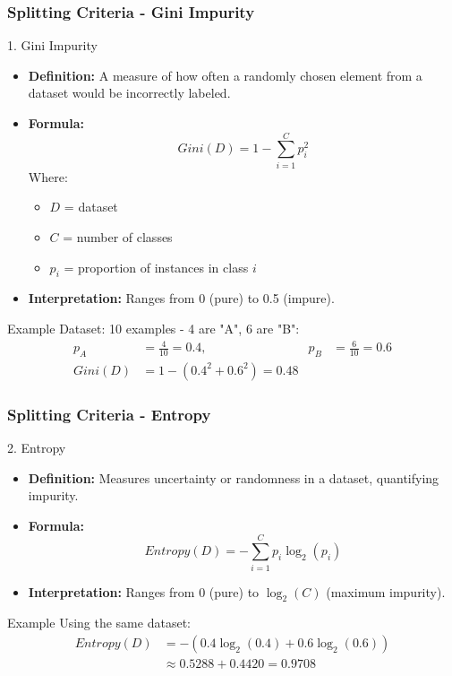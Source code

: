 \documentclass[aspectratio=169]{beamer}
\begin{document}
\begin{frame}[fragile]
  \frametitle{Splitting Criteria - Gini Impurity}
  \begin{block}{1. Gini Impurity}
    \begin{itemize}
      \item \textbf{Definition:} A measure of how often a randomly chosen element from a dataset would be incorrectly labeled.
      \item \textbf{Formula:}
        \begin{equation}
        Gini(D) = 1 - \sum_{i=1}^{C} p_i^2
        \end{equation}
        Where:
        \begin{itemize}
          \item \( D \) = dataset
          \item \( C \) = number of classes
          \item \( p_i \) = proportion of instances in class \( i \)
        \end{itemize}
      \item \textbf{Interpretation:} Ranges from 0 (pure) to 0.5 (impure).
    \end{itemize}
  \end{block}

  \begin{block}{Example}
    Dataset: 10 examples - 4 are "A", 6 are "B":
    \begin{align*}
      p_A &= \frac{4}{10} = 0.4, & p_B &= \frac{6}{10} = 0.6 \\
      Gini(D) &= 1 - (0.4^2 + 0.6^2) = 0.48
    \end{align*}
  \end{block}
\end{frame}

\begin{frame}[fragile]
  \frametitle{Splitting Criteria - Entropy}
  \begin{block}{2. Entropy}
    \begin{itemize}
      \item \textbf{Definition:} Measures uncertainty or randomness in a dataset, quantifying impurity.
      \item \textbf{Formula:}
        \begin{equation}
        Entropy(D) = -\sum_{i=1}^{C} p_i \log_2(p_i)
        \end{equation}
      \item \textbf{Interpretation:} Ranges from 0 (pure) to \(\log_2(C)\) (maximum impurity).
    \end{itemize}
  \end{block}

  \begin{block}{Example}
    Using the same dataset:
    \begin{align*}
      Entropy(D) &= -\left(0.4 \log_2(0.4) + 0.6 \log_2(0.6)\right) \\
      &\approx 0.5288 + 0.4420 = 0.9708
    \end{align*}
  \end{block}
\end{frame}
\end{document}
